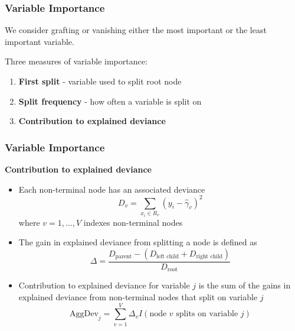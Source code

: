\documentclass{beamer}
\begin{document}

\begin{frame}

    \frametitle{Variable Importance}
    
    We consider grafting or vanishing either the most important or the least important variable.

\medskip

    Three measures of variable importance:
    
    \begin{enumerate}
        \item \textbf{First split} - variable used to split root node
        \item \textbf{Split frequency} - how often a variable is split on
        \item \textbf{Contribution to explained deviance}
    \end{enumerate}
    
\end{frame}



\begin{frame}

    \frametitle{Variable Importance}
    
    \textbf{Contribution to explained deviance}
    
    \footnotesize
    
    \begin{itemize}
        \item Each non-terminal node has an associated deviance 
        \begin{equation*}
            D_v = \sum_{x_i \in R_v}(y_i - \hat{\gamma}_v)^2
        \end{equation*}
        where $v = 1, \dots, V$ indexes non-terminal nodes
        \item The gain in explained deviance from splitting a node is defined as
        \begin{equation*}
            \Delta = \frac{D_\text{parent}-(D_\text{left child} + D_\text{right child})}
                     {D_\text{root}}
        \end{equation*}
        \item Contribution to explained deviance for variable $j$ is the sum
              of the gains in explained deviance from non-terminal nodes that
              split on variable $j$
        \begin{equation*}
            \text{AggDev}_j = \sum_{v=1}^V \Delta_v 
                                I(\text{node } v \text{ splits on variable } j)
        \end{equation*}
    \end{itemize}

\end{frame}
\end{document}
